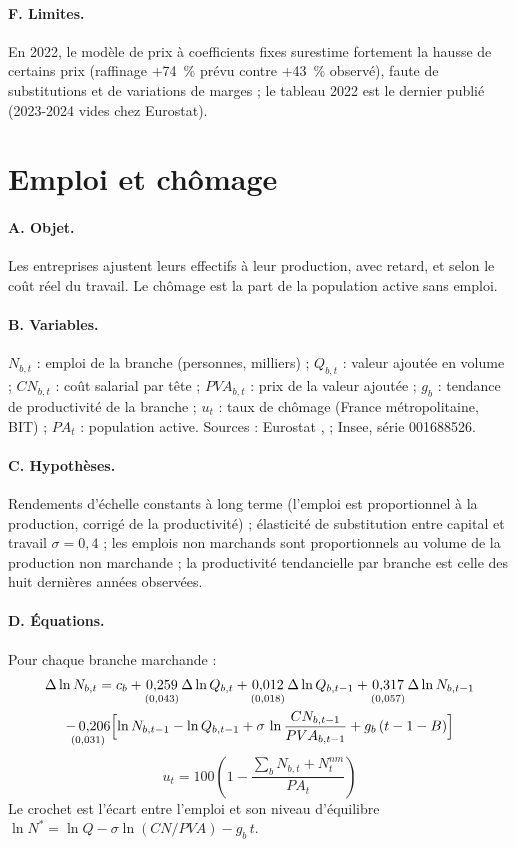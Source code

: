 \paragraph{F. Limites.} En 2022, le modèle de prix à coefficients fixes surestime fortement la hausse de certains
prix (raffinage +74~\% prévu contre +43~\% observé), faute de substitutions et de variations de marges ; le tableau
2022 est le dernier publié (2023-2024 vides chez Eurostat).

\section{Emploi et chômage}
\label{sec:emploi}

\paragraph{A. Objet.} Les entreprises ajustent leurs effectifs à leur production, avec retard, et selon le coût réel
du travail. Le chômage est la part de la population active sans emploi.

\paragraph{B. Variables.} $N_{b,t}$ : emploi de la branche (personnes, milliers) ; $Q_{b,t}$ : valeur ajoutée en
volume ; $CN_{b,t}$ : coût salarial par tête ; $PVA_{b,t}$ : prix de la valeur ajoutée ; $g_b$ : tendance de
productivité de la branche ; $u_t$ : taux de chômage (France métropolitaine, BIT) ; $PA_t$ : population active.
Sources : Eurostat ,  ; Insee, série 001688526.

\paragraph{C. Hypothèses.} Rendements d'échelle constants à long terme (l'emploi est proportionnel à la production,
corrigé de la productivité) ; élasticité de substitution entre capital et travail $\sigma = 0{,}4$ ; les emplois non
marchands sont proportionnels au volume de la production non marchande ; la productivité tendancielle par branche est
celle des huit dernières années observées.

\paragraph{D. Équations.} Pour chaque branche marchande :
\begin{multline}
\Delta\ln N_{b,t} = c_b + \underset{(0{,}043)}{0{,}259}\,\Delta\ln Q_{b,t} + \underset{(0{,}018)}{0{,}012}\,\Delta\ln Q_{b,t-1}
+ \underset{(0{,}057)}{0{,}317}\,\Delta\ln N_{b,t-1} \\
\underset{(0{,}031)}{-\,0{,}206}\Bigl[\ln N_{b,t-1} - \ln Q_{b,t-1} + \sigma\,\ln\frac{CN_{b,t-1}}{PVA_{b,t-1}} + g_b\,(t-1-B)\Bigr]
\end{multline}
\begin{equation}
u_t = 100\left(1 - \frac{\sum_b N_{b,t} + N^{nm}_t}{PA_t}\right)
\end{equation}
Le crochet est l'écart entre l'emploi et son niveau d'équilibre $\ln N^* = \ln Q - \sigma \ln(CN/PVA) - g_b\,t$.

